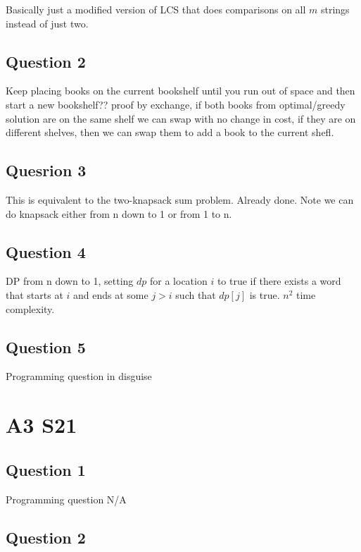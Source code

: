 \documentclass[11pt]{article}
\begin{document}
Basically just a modified version of LCS that does comparisons on all $m$ strings instead of just two.

\subsection{Question 2}

Keep placing books on the current bookshelf until you run out of space and then start a new bookshelf?? proof by exchange, if both books from optimal/greedy solution are on the same shelf we can swap with no change in cost, if they are on different shelves, then we can swap them to add a book to the current shefl.

\subsection{Quesrion 3}

This is equivalent to the two-knapsack sum problem. Already done. Note we can do knapsack either from n down to 1 or from 1 to n.

\subsection{Question 4}

DP from n down to 1, setting $dp$ for a location $i$ to true if there exists a word that starts at $i$ and ends at some $j > i$ such that $dp[j]$ is true. $n^2$ time complexity.

\subsection{Question 5}

Programming question in disguise

\section{A3 S21}

\subsection{Question 1}

Programming question N/A

\subsection{Question 2}
\end{document}
